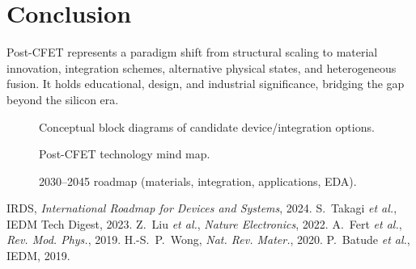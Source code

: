 \documentclass[conference]{IEEEtran}
\newcommand{\tikzcol}[2][\columnwidth]{\resizebox{#1}{!}{}}
\begin{document}
\section{Conclusion}
Post-CFET represents a paradigm shift from structural scaling to material innovation, integration schemes, alternative physical states, and heterogeneous fusion. It holds educational, design, and industrial significance, bridging the gap beyond the silicon era.

\FloatBarrier

\begin{figure*}[!t]
  \centering
  \tikzcol[.95\textwidth]{figures/block_diagram.tex}
  \caption{Conceptual block diagrams of candidate device/integration options.}
\end{figure*}

\begin{figure*}[!t]
  \centering
  \tikzcol[.95\textwidth]{figures/mindmap.tex}
  \caption{Post-CFET technology mind map.}
\end{figure*}

\begin{figure*}[!t]
  \centering
  \tikzcol[.95\textwidth]{figures/roadmap.tex}
  \caption{2030--2045 roadmap (materials, integration, applications, EDA).}
\end{figure*}

\clearpage

\begin{thebibliography}{00}
 IRDS, \emph{International Roadmap for Devices and Systems}, 2024.
 S.~Takagi \emph{et al.}, IEDM Tech Digest, 2023.
 Z.~Liu \emph{et al.}, \emph{Nature Electronics}, 2022.
 A.~Fert \emph{et al.}, \emph{Rev. Mod. Phys.}, 2019.
 H.-S.~P.~Wong, \emph{Nat. Rev. Mater.}, 2020.
 P.~Batude \emph{et al.}, IEDM, 2019.
\end{thebibliography}

\end{document}
